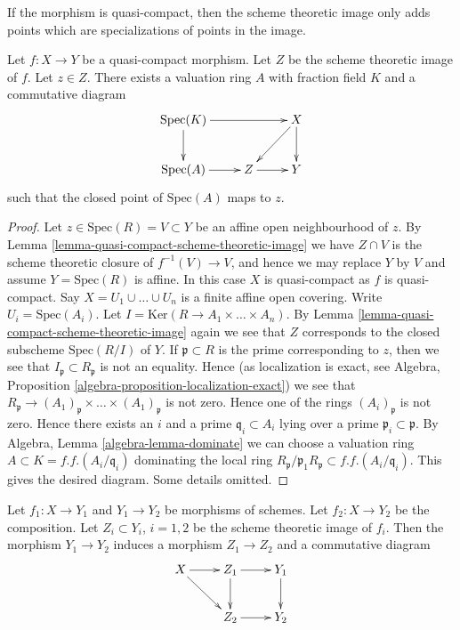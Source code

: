 \noindent
If the morphism is quasi-compact, then the scheme theoretic image only
adds points which are specializations of points in the image.

\begin{lemma}
\label{lemma-reach-points-scheme-theoretic-image}
Let $f : X \to Y$ be a quasi-compact morphism.
Let $Z$ be the scheme theoretic image of $f$.
Let $z \in Z$. There exists a valuation ring $A$ with
fraction field $K$ and a commutative diagram
$$
\xymatrix{
\text{Spec}(K) \ar[rr] \ar[d] & & X \ar[d] \ar[ld] \\
\text{Spec}(A) \ar[r] & Z \ar[r] & Y
}
$$
such that the closed point of $\text{Spec}(A)$ maps to $z$.
\end{lemma}

\begin{proof}
Let $z \in \text{Spec}(R) = V \subset Y$ be an affine open
neighbourhood of $z$. By
Lemma \ref{lemma-quasi-compact-scheme-theoretic-image}
we have $Z \cap V$ is the scheme theoretic closure of
$f^{-1}(V) \to V$, and hence we may replace $Y$ by $V$
and assume $Y = \text{Spec}(R)$ is affine.
In this case $X$ is quasi-compact as $f$ is quasi-compact.
Say $X = U_1 \cup \ldots \cup U_n$
is a finite affine open covering. Write $U_i = \text{Spec}(A_i)$.
Let $I = \text{Ker}(R \to A_1 \times \ldots \times A_n)$.
By Lemma \ref{lemma-quasi-compact-scheme-theoretic-image}
again we see that $Z$ corresponds to the closed subscheme
$\text{Spec}(R/I)$ of $Y$. If $\mathfrak p \subset R$ is
the prime corresponding to $z$, then we see that
$I_{\mathfrak p} \subset R_{\mathfrak p}$ is not an
equality. Hence (as localization is exact, see
Algebra, Proposition \ref{algebra-proposition-localization-exact})
we see that
$R_{\mathfrak p} \to
(A_1)_{\mathfrak p} \times \ldots \times (A_1)_{\mathfrak p}$
is not zero. Hence one of the rings $(A_i)_{\mathfrak p}$ is not zero.
Hence there exists an $i$ and a prime $\mathfrak q_i \subset A_i$
lying over a prime $\mathfrak p_i \subset \mathfrak p$.
By Algebra, Lemma \ref{algebra-lemma-dominate} we can choose a valuation ring
$A \subset K = f.f.(A_i/\mathfrak q_i)$ dominating
the local ring
$R_{\mathfrak p}/\mathfrak p_1R_{\mathfrak p} \subset f.f.(A_i/\mathfrak q_i)$.
This gives the desired diagram. Some details omitted.
\end{proof}


\begin{lemma}
\label{lemma-factor-factor}
Let $f_1 : X \to Y_1$ and $Y_1 \to Y_2$ be morphisms of schemes.
Let $f_2 : X \to Y_2$ be the composition. Let $Z_i \subset Y_i$, $i = 1, 2$ be
the scheme theoretic image of $f_i$. Then the morphism
$Y_1 \to Y_2$ induces a morphism $Z_1 \to Z_2$ and a
commutative diagram
$$
\xymatrix{
X \ar[r] \ar[rd] & Z_1 \ar[d] \ar[r] & Y_1 \ar[d] \\
& Z_2 \ar[r] & Y_2
}
$$
\end{lemma}

